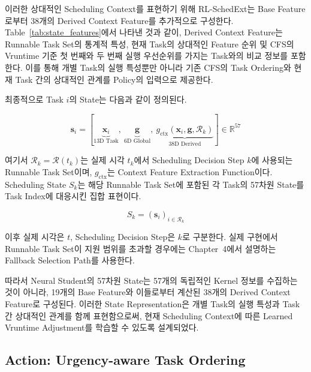 이러한 상대적인 Scheduling Context를 표현하기 위해
RL-SchedExt는 Base Feature로부터 38개의
Derived Context Feature를 추가적으로 구성한다.
Table~\ref{tab:state_features}에서 나타낸 것과 같이,
Derived Context Feature는 Runnable Task Set의
통계적 특성, 현재 Task의 상대적인 Feature 순위 및
CFS의 Vruntime 기준 첫 번째와 두 번째 실행 우선순위를
가지는 Task와의 비교 정보를 포함한다.
이를 통해 개별 Task의 실행 특성뿐만 아니라
기존 CFS의 Task Ordering와 현재 Task 간의
상대적인 관계를 Policy의 입력으로 제공한다.

최종적으로 Task $i$의 State는 다음과 같이 정의된다.

\begin{equation}
    \mathbf{s}_i = \left[\underbrace{\mathbf{x}_i}_{\text{13D Task}},\ \underbrace{\mathbf{g}}_{\text{6D Global}},\ \underbrace{g_{\mathrm{ctx}}(\mathbf{x}_i,\mathbf{g},\mathcal{R}_k)}_{\text{38D Derived}}\right] \in \mathbb{R}^{57}
    \label{eq:state_representation}
\end{equation}

여기서 $\mathcal{R}_k=\mathcal{R}(t_k)$는 실제 시각 $t_k$에서
Scheduling Decision Step $k$에 사용되는 Runnable Task Set이며,
$g_{\mathrm{ctx}}$는 Context Feature Extraction Function이다.
Scheduling State $S_k$는 해당 Runnable Task Set에 포함된 각 Task의
57차원 State를 Task Index에 대응시킨 집합 표현이다.

\begin{equation}
    S_k = (\mathbf{s}_i)_{i\in\mathcal{R}_k}
    \label{eq:scheduling_state}
\end{equation}

이후 실제 시각은 $t$, Scheduling Decision Step은 $k$로 구분한다.
실제 구현에서 Runnable Task Set이 지원 범위를 초과할 경우에는
Chapter~4에서 설명하는 Fallback Selection Path를 사용한다.

따라서 Neural Student의 57차원 State는 57개의 독립적인
Kernel 정보를 수집하는 것이 아니라,
19개의 Base Feature와 이들로부터 계산된 38개의
Derived Context Feature로 구성된다.
이러한 State Representation은 개별 Task의 실행 특성과
Task 간 상대적인 관계를 함께 표현함으로써,
현재 Scheduling Context에 따른 Learned Vruntime Adjustment를
학습할 수 있도록 설계되었다.


\subsection{Action: Urgency-aware Task Ordering}
\label{sec:design-action-urgency-aware-task-ordering}

